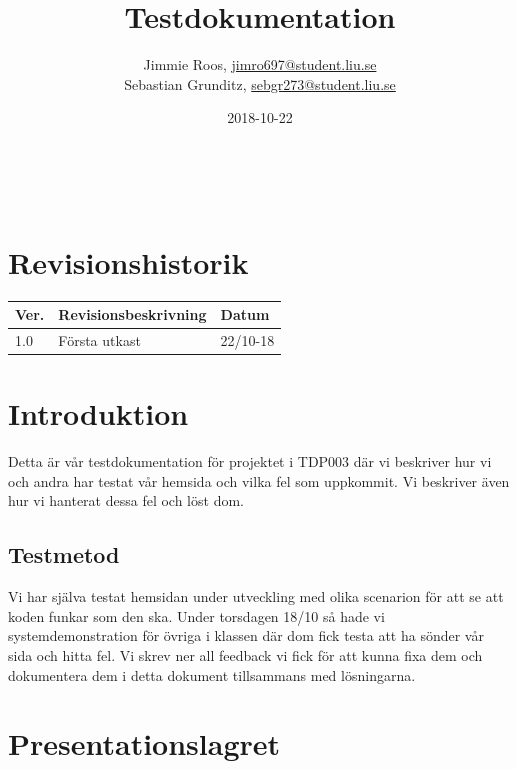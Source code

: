 \documentclass{TDP003mall}
\author{Jimmie Roos, \url{jimro697@student.liu.se}\\
Sebastian Grunditz, \url{sebgr273@student.liu.se}}
\title{Testdokumentation}
\date{2018-10-22}
\begin{document}
\projectpage
\tableofcontents
⁠
\thispagestyle{empty}
\newpage
{}
\section*{Revisionshistorik}
\begin{table}[!h]
\begin{tabularx}{\linewidth}{|l|X|l|}
\hline
Ver. & Revisionsbeskrivning & Datum \\\hline
1.0 & Första utkast & 22/10-18 \\\hline
\end{tabularx}
\end{table}

\section{Introduktion}
Detta är vår testdokumentation för projektet i TDP003 där vi beskriver hur vi och andra har testat vår hemsida och vilka fel som uppkommit. Vi beskriver även hur vi hanterat dessa fel och löst dom.
\subsection{Testmetod}
Vi har själva testat hemsidan under utveckling med olika scenarion för att se att koden funkar som den ska. Under torsdagen 18/10 så hade vi systemdemonstration för övriga i klassen där dom fick testa att ha sönder vår sida och hitta fel. Vi skrev ner all feedback vi fick för att kunna fixa dem och dokumentera dem i detta dokument tillsammans med lösningarna.

\section{Presentationslagret}
\label{sec:presentation}
\end{document}
